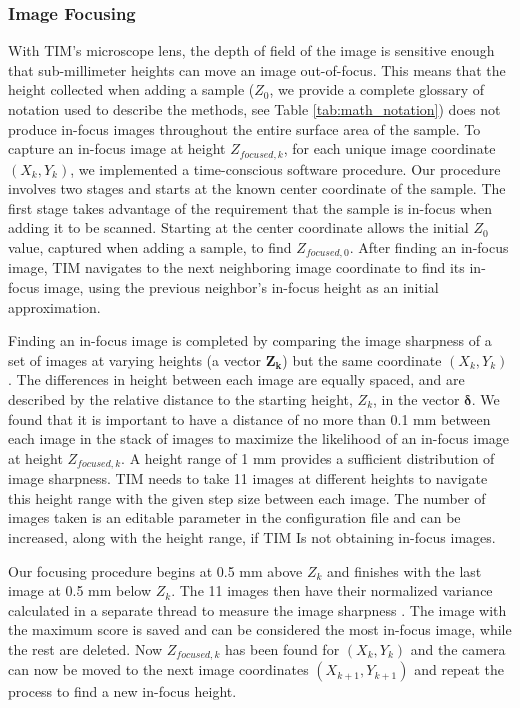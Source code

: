 \documentclass[a4paper,12pt]{article}
\begin{document}
\subsubsection{Image Focusing}

With TIM's microscope lens, the depth of field of the image is sensitive enough that sub-millimeter heights can move an image out-of-focus.
This means that the height collected when adding a sample ($Z_0$, we provide a complete glossary of notation used to describe the methods, see Table \ref{tab:math_notation}) does not produce in-focus images throughout the entire surface area of the sample.
To capture an in-focus image at height $Z_{focused,k}$, for each unique image coordinate $(X_k, Y_k)$, we implemented a time-conscious software procedure. 
Our procedure involves two stages and starts at the known center coordinate of the sample.
The first stage takes advantage of the requirement that the sample is in-focus when adding it to be scanned.
Starting at the center coordinate allows the initial $Z_0$ value, captured when adding a sample, to find $Z_{focused,0}$. 
After finding an in-focus image, TIM navigates to the next neighboring image coordinate to find its in-focus image, using the previous neighbor's in-focus height as an initial approximation.

Finding an in-focus image is completed by comparing the image sharpness of a set of images at varying heights (a vector $\boldsymbol{Z_k}$) but the same coordinate $(X_k, Y_k)$. 
The differences in height between each image are equally spaced, and are described by the relative distance to the starting height, $Z_k$, in the vector $\boldsymbol{\delta}$. 
We found that it is important to have a distance of no more than 0.1 mm between each image in the stack of images to maximize the likelihood of an in-focus image at height $Z_{focused,k}$.
A height range of 1 mm provides a sufficient distribution of image sharpness. TIM needs to take 11 images at different heights to navigate this height range with the given step size between each image. The number of images taken is an editable parameter in the configuration file and can be increased, along with the height range, if TIM Is not obtaining in-focus images.

Our focusing procedure begins at 0.5 mm above $Z_k$ and finishes with the last image at 0.5 mm below $Z_k$.
The 11 images then have their normalized variance calculated in a separate thread to measure the image sharpness \citep{sampat_extensive_2014}.
The image with the maximum score is saved and can be considered the most in-focus image, while the rest are deleted. 
Now $Z_{focused,k}$ has been found for $(X_k, Y_k)$ and the camera can now be moved to the next image coordinates $(X_{k+1}, Y_{k+1})$ and repeat the process to find a new in-focus height.
\end{document}
